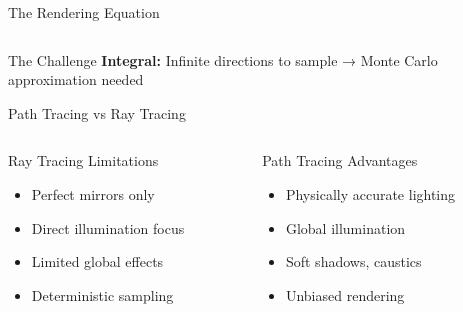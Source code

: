 \begin{frame}{The Rendering Equation}
\begin{columns}
\begin{column}{0.4\textwidth}
    \end{column}
  \end{columns}

  \begin{conceptbox}{The Challenge}
    \footnotesize
    \textbf{Integral:} Infinite directions to sample → Monte Carlo approximation needed
  \end{conceptbox}
\end{frame}

\begin{frame}{Path Tracing vs Ray Tracing}
  \begin{columns}
    \begin{column}{0.5\textwidth}
      \begin{raybox}{Ray Tracing Limitations}
        \begin{itemize}
          \item Perfect mirrors only
          \item Direct illumination focus
          \item Limited global effects
          \item Deterministic sampling
        \end{itemize}
      \end{raybox}
    \end{column}
    \begin{column}{0.5\textwidth}
      \begin{raybox}{Path Tracing Advantages}
        \begin{itemize}
          \item Physically accurate lighting
          \item Global illumination
          \item Soft shadows, caustics
          \item Unbiased rendering
        \end{itemize}
      \end{raybox}
    \end{column}
  \end{columns}
\end{frame}